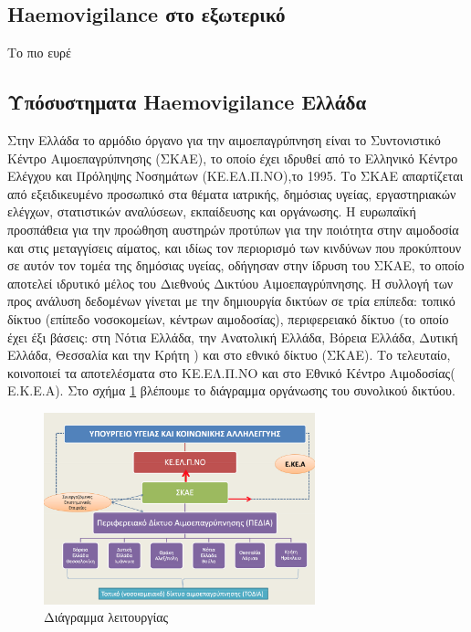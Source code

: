 	\subsection{Haemovigilance στο εξωτερικό}
	
	Το πιο ευρέ
	
		
	
	\subsection{Υπόσυστηματα Haemovigilance Ελλάδα}
	
	Στην Ελλάδα το αρμόδιο όργανο για την αιμοεπαγρύπνηση είναι το Συντονιστικό Κέντρο Αιμοεπαγρύπνησης (ΣΚΑΕ), το οποίο έχει ιδρυθεί από το Ελληνικό  Κέντρο Ελέγχου και Πρόληψης Νοσημάτων (ΚΕ.ΕΛ.Π.ΝΟ),το 1995. Το ΣΚΑΕ απαρτίζεται από εξειδικευμένο προσωπικό στα θέματα ιατρικής, δημόσιας υγείας, εργαστηριακών ελέγχων, στατιστικών αναλύσεων, εκπαίδευσης και οργάνωσης. Η ευρωπαϊκή προσπάθεια για την προώθηση αυστηρών προτύπων για την ποιότητα στην αιμοδοσία και στις μεταγγίσεις αίματος, και ιδίως τον περιορισμό των κινδύνων που προκύπτουν σε αυτόν τον τομέα της δημόσιας υγείας, οδήγησαν στην ίδρυση του ΣΚΑΕ, το οποίο αποτελεί ιδρυτικό μέλος του Διεθνούς Δικτύου Αιμοεπαγρύπνησης. 
	Η συλλογή των προς ανάλυση δεδομένων γίνεται με την δημιουργία δικτύων σε τρία επίπεδα: τοπικό δίκτυο (επίπεδο νοσοκομείων, κέντρων αιμοδοσίας), περιφερειακό δίκτυο (το οποίο έχει έξι βάσεις:  στη Νότια Ελλάδα, την Ανατολική Ελλάδα, Βόρεια Ελλάδα, Δυτική Ελλάδα, Θεσσαλία και την Κρήτη ) και στο εθνικό δίκτυο (ΣΚΑΕ). Το τελευταίο, κοινοποιεί τα αποτελέσματα στο ΚΕ.ΕΛ.Π.ΝΟ και στο Εθνικό Κέντρο Αιμοδοσίας( Ε.Κ.Ε.Α). Στο σχήμα \ref{fig:SKAE_diagram} βλέπουμε το διάγραμμα οργάνωσης του συνολικού δικτύου.
	
\begin{figure}[h!]
	    \centering
	    \includegraphics[width=0.7\textwidth]{SKAE_diagram.jpg}
	    \caption{Διάγραμμα λειτουργίας}
	    \label{fig:SKAE_diagram}
\end{figure}	

